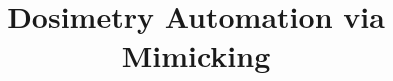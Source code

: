 \documentclass{article}
\title{Dosimetry Automation via Mimicking}
\date{}
\begin{document}
	\maketitle
	\setcounter{tocdepth}{5}
	\tableofcontents
	
	\begin{abstract}
		
	\end{abstract}
	
	
	
	
	
	
\end{document}
